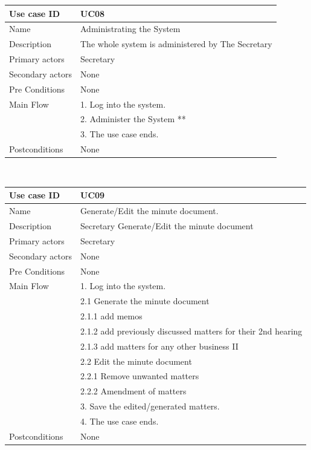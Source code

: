 \documentclass[a4paper,beamer]{article}
\begin{document}
			\begin{tabular}{|p{4cm}|p{8cm}|} \hline 
					\textbf{Use case ID} & \textbf{UC08}  \\ \hline
					Name & Administrating the System \\ \hline 
					Description & The whole system is administered by The Secretary \\ \hline 
					Primary actors & Secretary \\ \hline 
					Secondary actors & None \\ \hline 
					Pre Conditions & None \\ \hline
					Main Flow &	1. Log into the system.\\
										& 2. Administer the System ** \\
										& 3. The use case ends.\\ \hline
					Postconditions & None \\ \hline 
			\end{tabular} \\[.6cm]
			
			\begin{tabular}{|p{4cm}|p{8cm}|} \hline 
					\textbf{Use case ID} & \textbf{UC09}  \\ \hline
					Name & Generate/Edit the minute document. \\ \hline 
					Description & Secretary Generate/Edit the minute document \\ \hline 
					Primary actors & Secretary \\ \hline 
					Secondary actors & None \\ \hline 
					Pre Conditions & None \\ \hline
					Main Flow &	1. Log into the system.\\
										& 2.1 Generate the minute document\\
										& 2.1.1 add memos\\
										& 2.1.2 add previously discussed matters for their 2nd hearing \\
										& 2.1.3 add matters for any other business II\\
										& 2.2 Edit the minute document \\
										& 2.2.1 Remove unwanted matters\\
										& 2.2.2 Amendment of matters\\
										& 3. Save the edited/generated  matters.\\
										& 4. The use case ends.\\ \hline
					Postconditions & None \\ \hline 
			\end{tabular} \\[.6cm]
			
\end{document}
